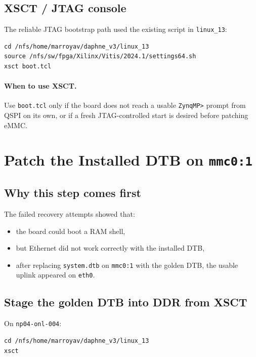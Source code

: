 \documentclass[a4paper,11pt]{article}
\begin{document}
\subsection*{XSCT / JTAG console}
The reliable JTAG bootstrap path used the existing script in
\texttt{linux\_13}:
\begin{listing}[H]
\begin{verbatim}
cd /nfs/home/marroyav/daphne_v3/linux_13
source /nfs/sw/fpga/Xilinx/Vitis/2024.1/settings64.sh
xsct boot.tcl
\end{verbatim}
\caption{Use the known-good boot.tcl to reach U-Boot via JTAG}
\end{listing}

\paragraph{When to use XSCT.}
Use \texttt{boot.tcl} only if the board does not reach a usable
\texttt{ZynqMP>} prompt from QSPI on its own, or if a fresh JTAG-controlled
start is desired before patching eMMC.

\clearpage
\section{Patch the Installed DTB on \texttt{mmc0:1}}

\subsection*{Why this step comes first}
The failed recovery attempts showed that:
\begin{itemize}
  \item the board could boot a RAM shell,
  \item but Ethernet did not work correctly with the installed DTB,
  \item after replacing \texttt{system.dtb} on \texttt{mmc0:1} with the golden
        DTB, the usable uplink appeared on \texttt{eth0}.
\end{itemize}

\subsection*{Stage the golden DTB into DDR from XSCT}
On \texttt{np04-onl-004}:
\begin{listing}[H]
\begin{verbatim}
cd /nfs/home/marroyav/daphne_v3/linux_13
xsct
\end{verbatim}
\caption{Start XSCT}
\end{listing}
\end{document}
